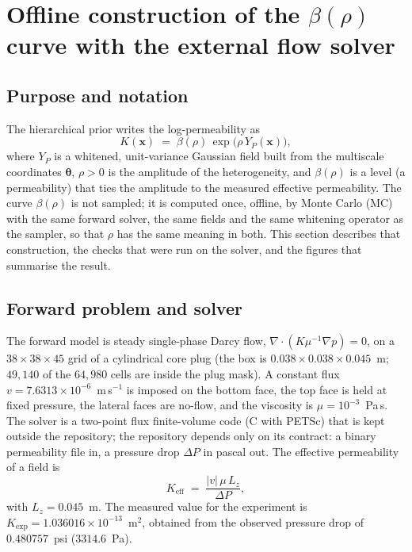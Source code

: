 \providecommand{\figdir}{figures/}
\providecommand{\Kexp}{K_{\mathrm{exp}}}
\providecommand{\Keff}{K_{\mathrm{eff}}}

\section{Offline construction of the $\beta(\rho)$ curve with the external flow solver}
\label{sec:external-curve}

\subsection{Purpose and notation}
The hierarchical prior writes the log-permeability as
\begin{equation}
  K(\mathbf{x}) \;=\; \beta(\rho)\,\exp\!\big(\rho\, Y_P(\mathbf{x})\big),
  \label{eq:prior-field}
\end{equation}
where $Y_P$ is a whitened, unit-variance Gaussian field built from the multiscale coordinates $\boldsymbol\theta$, $\rho>0$ is the amplitude of the heterogeneity, and $\beta(\rho)$ is a level (a permeability) that ties the amplitude to the measured effective permeability. The curve $\beta(\rho)$ is not sampled; it is computed once, offline, by Monte Carlo (MC) with the same forward solver, the same fields and the same whitening operator as the sampler, so that $\rho$ has the same meaning in both. This section describes that construction, the checks that were run on the solver, and the figures that summarise the result.

\subsection{Forward problem and solver}
The forward model is steady single-phase Darcy flow, $\nabla\!\cdot(K\mu^{-1}\nabla p)=0$, on a $38\times38\times45$ grid of a cylindrical core plug (the box is $0.038\times0.038\times0.045$~m; $49{,}140$ of the $64{,}980$ cells are inside the plug mask). A constant flux $v=7.6313\times10^{-6}$~m\,s$^{-1}$ is imposed on the bottom face, the top face is held at fixed pressure, the lateral faces are no-flow, and the viscosity is $\mu=10^{-3}$~Pa\,s. The solver is a two-point flux finite-volume code (C with PETSc) that is kept outside the repository; the repository depends only on its contract: a binary permeability file in, a pressure drop $\Delta P$ in pascal out. The effective permeability of a field is
\begin{equation}
  \Keff \;=\; \frac{|v|\,\mu\,L_z}{\Delta P},
  \label{eq:keff}
\end{equation}
with $L_z=0.045$~m. The measured value for the experiment is $\Kexp = 1.036016\times10^{-13}$~m$^2$, obtained from the observed pressure drop of $0.480757$~psi ($3314.6$~Pa).

